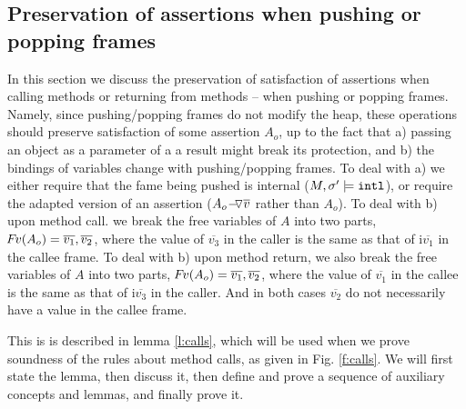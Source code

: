 \newcommand{\Ao}{A_{o}}

\subsection{Preservation of assertions when pushing or popping frames}

In this section we  discuss the preservation of satisfaction of assertions when calling methods or returning from methods -- \ie when pushing or popping  frames. 
Namely, since  pushing/popping frames  do not modify the heap, these operations should preserve satisfaction of some assertion $\Ao$, up to the fact that a) passing an object as a parameter of a a result might break its protection, and 
b) the bindings of variables change  with pushing/popping frames.
To deal with a) we either require that the fame being pushed is internal ($M, \sigma' \models \mbox{\normalfont{\texttt{intl}}}$), or require the adapted version of an assertion (\ie  ${\PushAS  {v} { \Ao}}$ rather than $\Ao$).
To deal with b) upon method call. we break the free variables of $A$ into two parts, \ie $\fv(\Ao) =  \overline{v_1}, \overline{v_2}$, where the value of $\overline{v_3}$ in the caller is the same as that of  i$\overline{v_1}$ in the callee frame.
To deal with b) upon method return, we also break the free variables of $A$ into two parts, \ie $\fv(\Ao) =  \overline{v_1}, \overline{v_2}$, where the value of $\overline{v_1}$ in the callee is the same as that of  i$\overline{v_3}$ in the caller.
And in both cases   $\overline {v_2}$ do not necessarily have a value in the callee frame.

This is is described in  lemma \ref{l:calls}, 
 which will be used when we prove soundness of the rules about method calls, as given in Fig. \ref{f:calls}. 
We will first state  the lemma,
then discuss it,   then    define and prove a sequence of auxiliary concepts and 
 lemmas, and finally prove it.  
 
